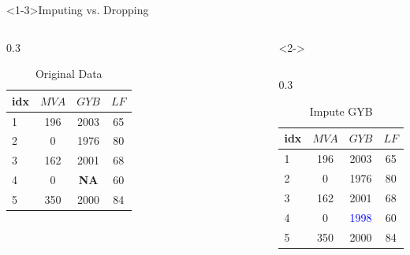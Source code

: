 \documentclass[aspectratio=169]{beamer}
\begin{document}
\begin{frame}<1-3>{Imputing vs. Dropping}
    \begin{columns}
        \centering
        \begin{column} [b] {0.3\textwidth}
            \centering
            \begin{table}
                \centering
                \begin{tabular}{lccc}
                    \toprule
                    idx & $MVA$ & $GYB$ & $LF$ \\
                    \midrule
                    1 & 196 & 2003  & 65    \\
                    2 & 0   & 1976  & 80    \\
                    3 & 162 & 2001  & 68    \\
                    4 & 0   & \textbf{NA}  & 60    \\
                    5 & 350 & 2000  & 84    \\
                    \bottomrule
                \end{tabular}
                \caption{Original Data}
            \end{table}
        \end{column}
        \begin{uncoverenv}<2->
        \begin{column} [b] {0.3\textwidth}
            \centering
            \begin{table}
                \centering
                \begin{tabular}{lccc}
                    \toprule
                    idx & $MVA$ & $GYB$ & $LF$ \\
                    \midrule
                    1 & 196 & 2003  & 65    \\
                    2 & 0   & 1976  & 80    \\
                    3 & 162 & 2001  & 68    \\
                    4 & 0   & \textcolor{blue}{1998}  & 60    \\
                    5 & 350 & 2000  & 84    \\
                    \bottomrule
                \end{tabular}
                \caption{Impute GYB}
            \end{table}
        \end{column}
        \end{uncoverenv}

\end{columns}
\end{frame}
\end{document}
